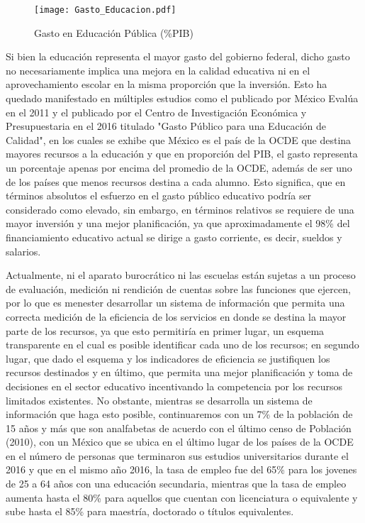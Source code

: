 \begin{figure}[H]
\centering
\texttt{[image: Gasto\_Educacion.pdf]}
\caption{Gasto en Educación Pública (\%PIB)}
\label{Edu}
\end{figure}


Si bien la educación representa el mayor gasto del gobierno federal, dicho gasto no necesariamente implica una mejora en la calidad educativa ni en el aprovechamiento escolar en la misma proporción que la inversión. Esto ha quedado manifestado en múltiples estudios como el publicado por México Evalúa en el 2011 y el publicado por el Centro de Investigación Económica y Presupuestaria en el 2016 titulado "Gasto Público para una Educación de Calidad", en los cuales se exhibe que México es el país de la OCDE que destina mayores recursos a la educación y que en proporción del PIB, el gasto representa un porcentaje apenas por encima del promedio de la OCDE, además de ser uno de los países que menos recursos destina a cada alumno. Esto significa, que en términos absolutos el esfuerzo en el gasto público educativo podría ser considerado como elevado, sin embargo, en términos relativos se requiere de una mayor inversión y una mejor planificación, ya que aproximadamente el 98\% del financiamiento educativo actual se dirige a gasto corriente, es decir, sueldos y salarios.\bigskip

Actualmente, ni el aparato burocrático ni las escuelas están sujetas a un proceso de evaluación, medición ni rendición de cuentas sobre las funciones que ejercen, por lo que es menester desarrollar un sistema de información que permita una correcta medición de la eficiencia de los servicios en donde se destina la mayor parte de los recursos, ya que esto permitiría en primer lugar, un esquema transparente en el cual es posible identificar cada uno de los recursos; en segundo lugar, que dado el esquema y los indicadores de eficiencia se justifiquen los recursos destinados y en último, que permita una mejor planificación y toma de decisiones en el sector educativo incentivando  la competencia por los recursos limitados existentes. No obstante, mientras se desarrolla un sistema de información que haga esto posible, continuaremos con un 7\% de la población de 15 años y más que son analfabetas de acuerdo con el último censo de Población (2010), con un México que se ubica en el último lugar de los países de la OCDE en el número de personas que terminaron sus estudios universitarios durante el 2016 y que en el mismo año 2016, la tasa de empleo fue del 65\% para los jovenes de 25 a 64 años con una educación secundaria, mientras que la tasa de empleo aumenta hasta el 80\% para aquellos que cuentan con licenciatura o equivalente y sube hasta el 85\% para maestría, doctorado o títulos equivalentes.\bigskip

